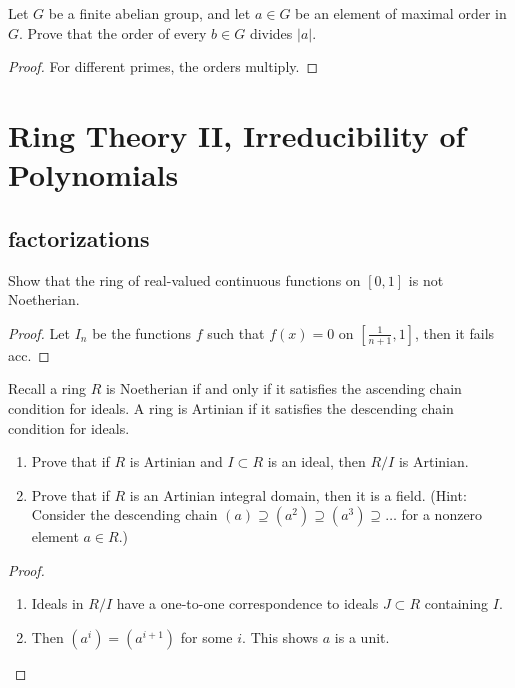 \documentclass[openany]{book}
\begin{document}
\begin{prob}
Let \( G \) be a finite abelian group, and let \( a \in G \) be an element of maximal order in \( G \). Prove that the order of every \( b \in G \) divides \( |a| \).
\end{prob}
\begin{proof}
    For different primes, the orders multiply.
\end{proof}







\chapter{Ring Theory II, Irreducibility of Polynomials}


\section{factorizations}
\begin{prob}[1.4]
    Show that the ring of real-valued continuous functions on $[0,1]$ is not Noetherian.
\end{prob}
\begin{proof}
    Let $I_n$ be the functions $f$ such that $f(x)=0$ on $[\frac{1}{n+1},1]$, then it fails acc.
\end{proof}

\begin{prob}[1.10]
    Recall a ring \( R \) is Noetherian if and only if it satisfies the ascending chain condition for ideals. A ring is Artinian if it satisfies the descending chain condition for ideals. 
\begin{enumerate}
    \item Prove that if \( R \) is Artinian and \( I \subset R \) is an ideal, then \( R/I \) is Artinian.
    \item Prove that if \( R \) is an Artinian integral domain, then it is a field. 
    (Hint: Consider the descending chain \( (a) \supseteq (a^2) \supseteq (a^3) \supseteq \dots \) for a nonzero element \( a \in R \).)
\end{enumerate}
\end{prob}
\begin{proof}
    \begin{enumerate}
        \item Ideals in $R/I$ have a one-to-one correspondence to ideals $J\subset R$ containing $I$.
        \item Then $(a^i)=(a^{i+1})$ for some $i$. This shows $a$ is a unit.
    \end{enumerate}
\end{proof}
\end{document}
